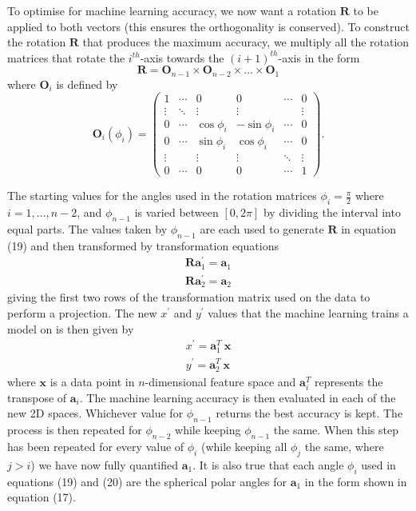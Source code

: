 \documentclass[a4paper,11pt,twoside]{article}
\begin{document}
To optimise for machine learning accuracy, we now want a rotation $\bm{R}$ to be applied to both vectors (this ensures the orthogonality is conserved). To construct the rotation $\bm{R}$ that produces the maximum accuracy, we multiply all the rotation matrices that rotate the $i^{th}$-axis towards the $(i+1)^{th}$-axis in the form
\begin{equation}
\bm{R}=\bm{O}_{n-1} \times \bm{O}_{n-2} \times \dotsc \times \bm{O}_{1} 
\end{equation}
where $\bm{O}_{i}$ is defined by
\begin{equation}
\bm{O}_i(\phi_i) = 
\begin{pmatrix}
  1 &  \cdots & 0 & 0 & \cdots &  0 \\
  \vdots  &  \ddots & \vdots& \vdots & &\vdots  \\
  0 & \cdots & \cos{\phi_i} & -\sin{\phi_i} &  \cdots & 0 \\
  0 &  \cdots & \sin{\phi_i} & \cos{\phi_i} &  \cdots & 0 \\
  \vdots  &  \ & \vdots& \vdots &\ddots&\vdots  \\
  0 & \cdots & 0 & 0 & \cdots & 1
 \end{pmatrix}.
\end{equation}

The starting values for the angles used in the rotation matrices $\phi_i=\frac{\pi}{2}$ where $i=1,\dotsc,n-2$, and $\phi_{n-1}$ is varied between $[0, 2\pi]$ by dividing the interval into equal parts. The values taken by $\phi_{n-1}$ are each used to generate $\bm{R}$ in equation (19) and then transformed by transformation equations
\begin{equation}
\begin{split}
\bm{R} \bm{a}_1^{\prime} = \bm{a}_1
\\
\bm{R} \bm{a}_2^{\prime} = \bm{a}_2
\end{split}
\end{equation}
giving the first two rows of the transformation matrix used on the data to perform a projection. The new $x^{\prime}$ and $y^{\prime}$ values that the machine learning trains a model on is then given by
\begin{equation}
\begin{split}
x^{\prime}=\bm{a}_1^T \ \bm{x}
\\
y^{\prime}=\bm{a}_2^T \ \bm{x}
\end{split}
\end{equation}
where $\bm{x}$ is a data point in $n$-dimensional feature space and $\bm{a}_i^T$ represents the transpose of $\bm{a}_i$. The machine learning accuracy is then evaluated in each of the new 2D spaces. Whichever value for $\phi_{n-1}$ returns the best accuracy is kept. The process is then repeated for $\phi_{n-2}$ while keeping $\phi_{n-1}$ the same. When this step has been repeated for every value of $\phi_i$ (while keeping all $\phi_{j}$ the same, where $j>i$) we have now fully quantified $\bm{a}_1$. It is also true that each angle $\phi_i$ used in equations (19) and (20) are the spherical polar angles for $\bm{a}_1$ in the form shown in equation (17).
\newline
\end{document}
